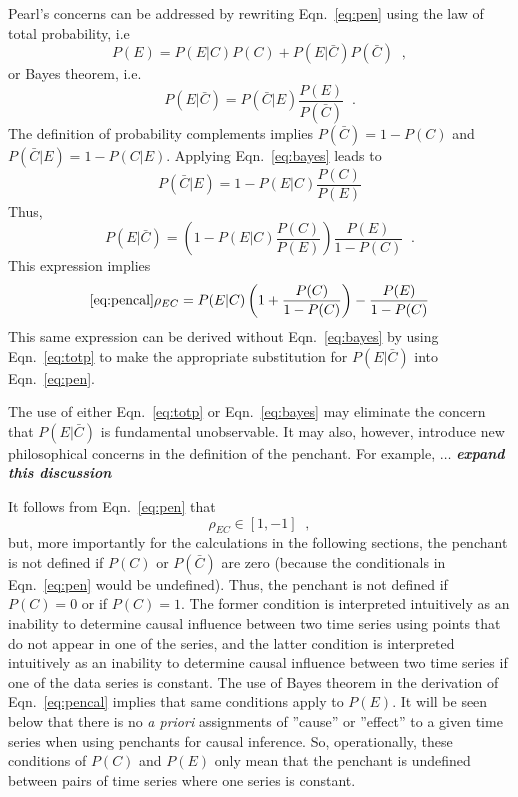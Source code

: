 \documentclass[a4paper,11pt,twocolumn]{article}
\begin{document}
Pearl's concerns can be addressed by rewriting Eqn.\ \ref{eq:pen} using the law of total probability, i.e
\begin{equation}
\label{eq:totp}
P(E) = P(E|C)P(C) + P(E|\bar{C})P(\bar{C})\;\;,
\end{equation}
or Bayes theorem, i.e.\ 
\begin{equation}
\label{eq:bayes}
P(E|\bar{C}) = P(\bar{C}|E)\frac{P(E)}{P(\bar{C})}\;\;.
\end{equation}
The definition of probability complements implies $P(\bar{C}) = 1-P(C)$ and $P(\bar{C}|E) = 1-P(C|E)$.  Applying Eqn.\ \ref{eq:bayes} leads to
\begin{equation}
P(\bar{C}|E) = 1-P(E|C)\frac{P(C)}{P(E)}
\end{equation}
Thus,
\begin{equation}
P(E|\bar{C}) = \left(1-P(E|C)\frac{P(C)}{P(E)}\right)\frac{P(E)}{1-P(C)}\;\;.
\end{equation}
This expression implies
\begin{equation}
\ref{eq:pencal}
\rho_{EC} = P(E|C)\left(1+\frac{P(C)}{1-P(C)}\right)-\frac{P(E)}{1-P(C)}
\end{equation}
This same expression can be derived without Eqn.\ \ref{eq:bayes} by using Eqn.\ \ref{eq:totp} to make the appropriate substitution for $P(E|\bar{C})$ into Eqn.\ \ref{eq:pen}.

The use of either Eqn.\ \ref{eq:totp} or Eqn.\ \ref{eq:bayes} may eliminate the concern that $P(E|\bar{C})$ is fundamental unobservable.  It may also, however, introduce new philosophical concerns in the definition of the penchant.  For example, $\ldots$ {\em {\bf expand this discussion}}

It follows from Eqn.\ \ref{eq:pen} that
\begin{equation}
\rho_{EC}\in\left[1,-1\right]\;\;,
\end{equation}
but, more importantly for the calculations in the following sections, the penchant is not defined if $P(C)$ or $P(\bar{C})$ are zero (because the conditionals in Eqn.\ \ref{eq:pen} would be undefined).  Thus, the penchant is not defined if $P(C)=0$ or if $P(C)=1$.  The former condition is interpreted intuitively as an inability to determine causal influence between two time series using points that do not appear in one of the series, and the latter condition is interpreted intuitively as an inability to determine causal influence between two time series if one of the data series is constant.  The use of Bayes theorem in the derivation of Eqn.\ \ref{eq:pencal} implies that same conditions apply to $P(E)$.  It will be seen below that there is no {\em a priori} assignments of ''cause'' or ''effect'' to a given time series when using penchants for causal inference.  So, operationally, these conditions of $P(C)$ and $P(E)$ only mean that the penchant is undefined between pairs of time series where one series is constant. 
\end{document}
